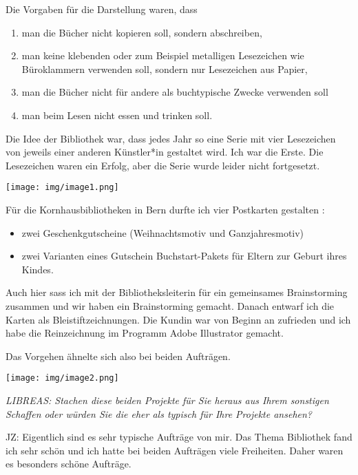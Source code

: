 \documentclass[a4paper,
fontsize=11pt,
oneside,
numbers=noperiodatend,
parskip=half-,
bibliography=totoc,
final
]{scrartcl}
\begin{document}
Die Vorgaben für die Darstellung waren, dass

\begin{enumerate}
\def\labelenumi{\arabic{enumi}.}
\item
  man die Bücher nicht kopieren soll, sondern abschreiben,
\item
  man keine klebenden oder zum Beispiel metalligen Lesezeichen wie
  Büroklammern verwenden soll, sondern nur Lesezeichen aus Papier,
\item
  man die Bücher nicht für andere als buchtypische Zwecke verwenden soll
\item
  man beim Lesen nicht essen und trinken soll.
\end{enumerate}

Die Idee der Bibliothek war, dass jedes Jahr so eine Serie mit vier
Lesezeichen von jeweils einer anderen Künstler*in gestaltet wird. Ich
war die Erste. Die Lesezeichen waren ein Erfolg, aber die Serie wurde
leider nicht fortgesetzt.

\begin{center}
\texttt{[image: img/image1.png]}
\end{center}

Für die Kornhausbibliotheken in Bern durfte ich vier Postkarten
gestalten :

\begin{itemize}
\item
  zwei Geschenkgutscheine (Weihnachtsmotiv und Ganzjahresmotiv)
\item
  zwei Varianten eines Gutschein Buchstart-Pakets für Eltern zur Geburt
  ihres Kindes.
\end{itemize}

Auch hier sass ich mit der Bibliotheksleiterin für ein gemeinsames
Brainstorming zusammen und wir haben ein Brainstorming gemacht. Danach
entwarf ich die Karten als Bleistiftzeichnungen. Die Kundin war von
Beginn an zufrieden und ich habe die Reinzeichnung im Programm Adobe
Illustrator gemacht.

Das Vorgehen ähnelte sich also bei beiden Aufträgen.

\begin{center}
\texttt{[image: img/image2.png]}
\end{center}

\emph{LIBREAS: Stachen diese beiden Projekte für Sie heraus aus Ihrem
sonstigen Schaffen oder würden Sie die eher als typisch für Ihre
Projekte ansehen?}

JZ: Eigentlich sind es sehr typische Aufträge von mir. Das Thema
Bibliothek fand ich sehr schön und ich hatte bei beiden Aufträgen viele
Freiheiten. Daher waren es besonders schöne Aufträge.
\end{document}
